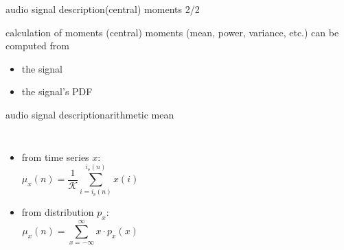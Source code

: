 \begin{frame}{audio signal description}{(central) moments 2/2}
	\toremember{}
	\begin{block}{calculation of moments}
		\centering
		(central) moments (mean, power, variance, etc.) can be computed from 
		\begin{itemize}
			\item	the signal
			\item	the signal's PDF 
		\end{itemize}		
	\end{block}
\end{frame}		

\begin{frame}{audio signal description}{arithmetic mean}
    \vspace{-7mm}
    \begin{columns}
    \begin{itemize}
        \item   from time series $x$:
            \begin{equation*}\label{eq:arith_mean}
                \mu_x(n) = \frac{1}{\mathcal{K}}\sum\limits_{i=i_{\mathrm{s}}(n)}^{i_{\mathrm{e}}(n)}{x(i)} 
            \end{equation*}
        \item   from distribution $p_x$:
            \begin{equation*}\label{eq:arith_mean2}
                \mu_x(n) = \sum\limits_{x=-\infty}^{\infty}{x\cdot p_x(x)} 
            \end{equation*}
    \end{itemize}
     
    \end{columns}
\end{frame}

